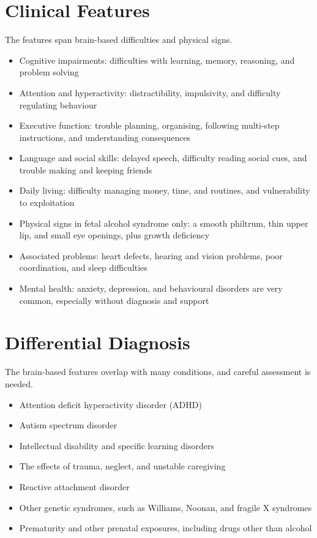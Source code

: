 \section*{Clinical Features}
The features span brain-based difficulties and physical signs.
\begin{itemize}
    \item Cognitive impairments: difficulties with learning, memory, reasoning, and problem solving
    \item Attention and hyperactivity: distractibility, impulsivity, and difficulty regulating behaviour
    \item Executive function: trouble planning, organising, following multi-step instructions, and understanding consequences
    \item Language and social skills: delayed speech, difficulty reading social cues, and trouble making and keeping friends
    \item Daily living: difficulty managing money, time, and routines, and vulnerability to exploitation
    \item Physical signs in fetal alcohol syndrome only: a smooth philtrum, thin upper lip, and small eye openings, plus growth deficiency
    \item Associated problems: heart defects, hearing and vision problems, poor coordination, and sleep difficulties
    \item Mental health: anxiety, depression, and behavioural disorders are very common, especially without diagnosis and support
\end{itemize}

\section*{Differential Diagnosis}
The brain-based features overlap with many conditions, and careful assessment is needed.
\begin{itemize}
    \item Attention deficit hyperactivity disorder (ADHD)
    \item Autism spectrum disorder
    \item Intellectual disability and specific learning disorders
    \item The effects of trauma, neglect, and unstable caregiving
    \item Reactive attachment disorder
    \item Other genetic syndromes, such as Williams, Noonan, and fragile X syndromes
    \item Prematurity and other prenatal exposures, including drugs other than alcohol
\end{itemize}

